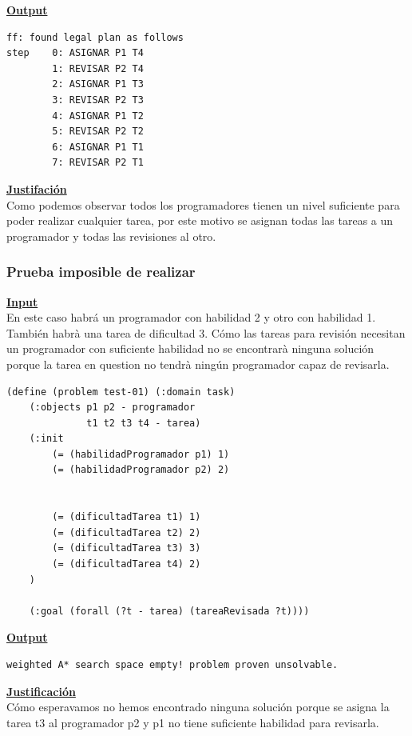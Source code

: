 \documentclass[11pt]{article}
\begin{document}
 \noindent \underline{\textbf{Output}}
\medskip
\begin{verbatim}
ff: found legal plan as follows
step    0: ASIGNAR P1 T4
        1: REVISAR P2 T4
        2: ASIGNAR P1 T3
        3: REVISAR P2 T3
        4: ASIGNAR P1 T2
        5: REVISAR P2 T2
        6: ASIGNAR P1 T1
        7: REVISAR P2 T1
\end{verbatim}
\medskip

\noindent \underline{\textbf{Justifación}}\\

Como podemos observar todos los programadores tienen un nivel suficiente para poder realizar cualquier tarea, por este motivo se asignan todas las tareas a un programador y todas las revisiones al otro.

\subsubsection{Prueba imposible de realizar}
\noindent \underline{\textbf{Input}} \\

En este caso habrá un programador con habilidad 2 y otro con habilidad 1. También habrà una tarea de dificultad 3. Cómo las tareas para revisión necesitan un programador con suficiente habilidad no se encontrarà ninguna solución porque la tarea en question no tendrà ningún programador capaz de revisarla.
\medskip
\begin{verbatim}
(define (problem test-01) (:domain task)
    (:objects p1 p2 - programador
			  t1 t2 t3 t4 - tarea)
    (:init
        (= (habilidadProgramador p1) 1)
        (= (habilidadProgramador p2) 2)
        
        
        (= (dificultadTarea t1) 1)
        (= (dificultadTarea t2) 2)
        (= (dificultadTarea t3) 3)
        (= (dificultadTarea t4) 2)
    )

    (:goal (forall (?t - tarea) (tareaRevisada ?t))))
\end{verbatim}

\noindent \underline{\textbf{Output}}
\medskip
\begin{verbatim}
weighted A* search space empty! problem proven unsolvable.
\end{verbatim}
\noindent \underline{\textbf{Justificación}} \\

Cómo esperavamos no hemos encontrado ninguna solución porque se asigna la tarea t3 al programador p2 y p1 no tiene suficiente habilidad para revisarla.
\medskip
\end{document}

